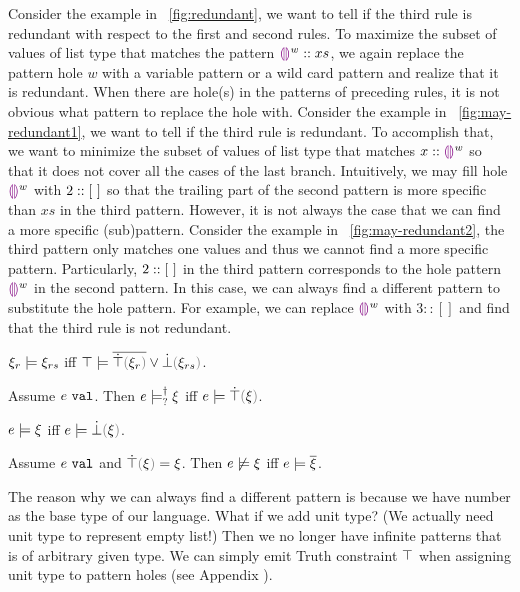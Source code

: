 \documentclass[runningheads,envcountsame,a4paper]{llncs}
\begin{document}
Consider the example in \figurename~\ref{fig:redundant}, we want to tell if the third rule is redundant with respect to the first and second rules. To maximize the subset of values of list type that matches the pattern $\textcolor{violet}{\llparenthesis}\textcolor{violet}{\rrparenthesis}^{w}::xs$, we again replace the pattern hole $w$ with a variable pattern or a wild card pattern and realize that it is redundant. When there are hole(s) in the patterns of preceding rules, it is not obvious what pattern to replace the hole with. Consider the example in \figurename~\ref{fig:may-redundant1}, we want to tell if the third rule is redundant. To accomplish that, we want to minimize the subset of values of list type that matches $x::\textcolor{violet}{\llparenthesis}\textcolor{violet}{\rrparenthesis}^{w}$ so that it does not cover all the cases of the last branch. Intuitively, we may fill hole $\textcolor{violet}{\llparenthesis}\textcolor{violet}{\rrparenthesis}^{w}$ with $2::[~]$ so that the trailing part of the second pattern is more specific than $xs$ in the third pattern. However, it is not always the case that we can find a more specific (sub)pattern. Consider the example in \figurename~\ref{fig:may-redundant2}, the third pattern only matches one values and thus we cannot find a more specific pattern. Particularly, $2::[~]$ in the third pattern corresponds to the hole pattern $\textcolor{violet}{\llparenthesis}\textcolor{violet}{\rrparenthesis}^{w}$ in the second pattern. In this case, we can always find a different pattern to substitute the hole pattern. For example, we can replace $\textcolor{violet}{\llparenthesis}\textcolor{violet}{\rrparenthesis}^{w}$ with $3::[]$ and find that the third rule is not redundant.
\begin{theorem}
  $\xi_r \models \xi_{rs}$ iff $\csatisfy{\ctruth}{\cor{\cdual{\ctruify{\xi_r}}}{\cfalsify{\xi_{rs}}}}$.
\end{theorem}

\begin{lemma}
  Assume $e ~\mathtt{val}$. Then $e \models_{?}^{\dag} \xi$ iff $\csatisfy{e}{\ctruify{\xi}}$.
\end{lemma}

\begin{lemma}
  $e \models \xi$ iff $\csatisfy{e}{\cfalsify{\xi}}$.
\end{lemma}

\begin{lemma}
  Assume $e ~\mathtt{val}$ and $\ctruify{\xi}=\xi$. Then $e \not\models \xi$ iff $e \models \overline{\xi}$.
\end{lemma}

The reason why we can always find a different pattern is because we have number as the base type of our language. What if we add unit type? (We actually need unit type to represent empty list!) Then we no longer have infinite patterns that is of arbitrary given type. We can simply emit Truth constraint $\top$ when assigning unit type to pattern holes (see Appendix \todo{}).
\end{document}
